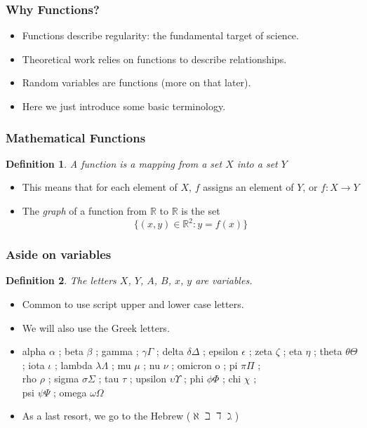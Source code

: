\documentclass[aspectratio=169, handout]{beamer}
\newtheorem{defn}{Definition}
\numberwithin{equation}{section}
\begin{document}
\begin{frame}
\frametitle{Why Functions?}
\begin{itemize}
\item Functions describe regularity: the fundamental target of science.
\item Theoretical work relies on functions to describe relationships.
\item Random variables are functions (more on that later).
\item Here we just introduce some basic terminology.
\end{itemize}
\end{frame}



\begin{frame}
\frametitle{Mathematical Functions}
\begin{defn}
A \textit{function} is a mapping from a set $X$ into a set $Y$
\end{defn}
\pause

\begin{itemize}
\item This means that for each element of $X$, $f$ assigns an element of $Y$, or $f: X\rightarrow Y$ \pause
\end{itemize}

\begin{itemize}
\item The \textit{graph} of a function from $\mathbb{R} $ to $\mathbb{R}$ is the set $$\{(x, y)\in \mathbb{R}^2: y=f(x)\}$$ 
\end{itemize}
\end{frame}



\begin{frame}
\frametitle{Aside on variables}
\begin{defn}
The letters $X$, $Y$, $A$, $B$, $x$, $y$ are \emph{variables}.
\end{defn}
\pause

\begin{itemize}
\item Common to use script upper and lower case letters.
\item We will also use the Greek letters.

\item[] alpha $\alpha$ ; beta $\beta$ ; gamma ; $\gamma\Gamma$ ; delta $\delta\Delta$ ; epsilon $\epsilon$ ; zeta $\zeta$ ; eta $\eta$ ; theta $\theta\Theta$ ; iota $\iota$ ;  lambda $\lambda\Lambda$ ; mu $\mu$ ; nu $\nu$ ; omicron o ; pi $\pi\Pi$ ; \\
 rho $\rho$ ; sigma $\sigma\Sigma$ ; tau $\tau$ ; upsilon $\upsilon\Upsilon$ ; phi $\phi\Phi$ ; chi $\chi$  ;\\
 psi $\psi\Psi$ ; omega $\omega\Omega$
\item As a last resort, we go to the Hebrew ($\aleph \beth \daleth \gimel$)
\end{itemize}


\end{frame}
\end{document}
